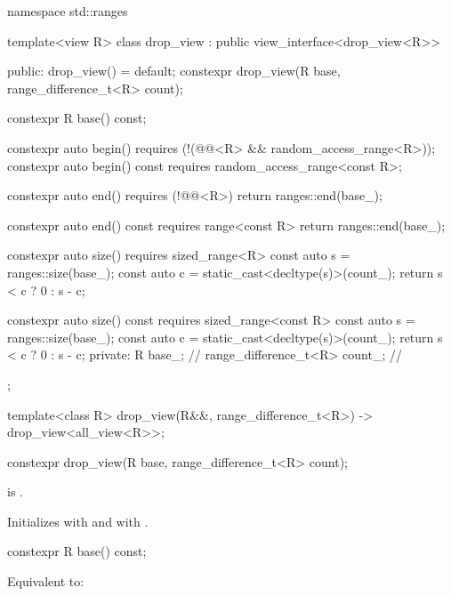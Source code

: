 %
\begin{codeblock}
namespace std::ranges {
  template<view R>
  class drop_view : public view_interface<drop_view<R>> {
  public:
    drop_view() = default;
    constexpr drop_view(R base, range_difference_t<R> count);

    constexpr R base() const;

    constexpr auto begin()
      requires (!(@@<R> && random_access_range<R>));
    constexpr auto begin() const
      requires random_access_range<const R>;

    constexpr auto end()
      requires (!@@<R>)
    { return ranges::end(base_); }

    constexpr auto end() const
      requires range<const R>
    { return ranges::end(base_); }

    constexpr auto size()
      requires sized_range<R>
    {
      const auto s = ranges::size(base_);
      const auto c = static_cast<decltype(s)>(count_);
      return s < c ? 0 : s - c;
    }

    constexpr auto size() const
      requires sized_range<const R>
    {
      const auto s = ranges::size(base_);
      const auto c = static_cast<decltype(s)>(count_);
      return s < c ? 0 : s - c;
    }
  private:
    R base_;                                    // \expos
    range_difference_t<R> count_;               // \expos
  };

  template<class R>
    drop_view(R&&, range_difference_t<R>) -> drop_view<all_view<R>>;
}
\end{codeblock}

%
\begin{itemdecl}
constexpr drop_view(R base, range_difference_t<R> count);
\end{itemdecl}

\begin{itemdescr}
\pnum
\expects
{} is .

\pnum
\effects
Initializes  with  and
 with .
\end{itemdescr}

%
\begin{itemdecl}
constexpr R base() const;
\end{itemdecl}

\begin{itemdescr}
\pnum
\effects
Equivalent to: 
\end{itemdescr}

